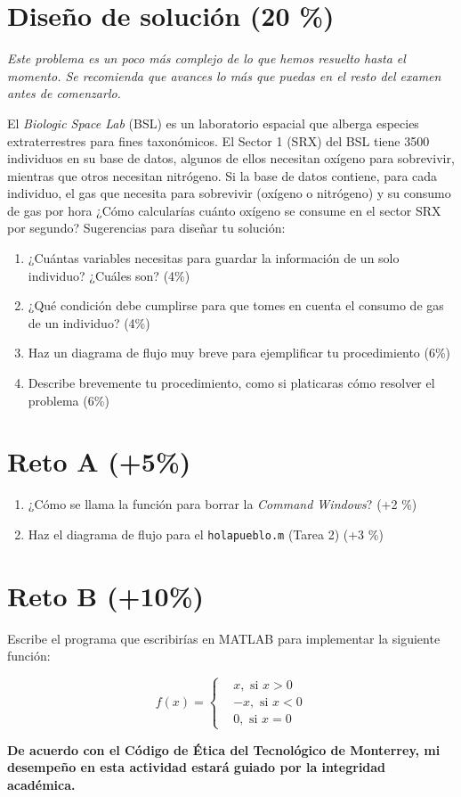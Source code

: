 \documentclass[11pt, onside]{article}
\begin{document}
\section{Diseño de solución (20 \%)}

{\small \it
Este problema es un poco más complejo de lo que hemos resuelto hasta el momento.
Se recomienda que avances lo más que puedas en el resto del examen antes de comenzarlo.
}

\bigskip

El \textit{Biologic Space Lab} (BSL) es un laboratorio espacial que alberga especies extraterrestres para fines taxonómicos.
El Sector 1 (SRX) del BSL tiene 3500 individuos en su base de datos, algunos de ellos necesitan oxígeno para sobrevivir, mientras que otros necesitan nitrógeno.
Si la base de datos contiene, para cada individuo, el gas que necesita para sobrevivir (oxígeno o nitrógeno) y su consumo de gas por hora ¿Cómo calcularías cuánto oxígeno se consume en el sector SRX por segundo?
Sugerencias para diseñar tu solución:
\begin{enumerate}[label=\alph*)]
    \item ¿Cuántas variables necesitas para guardar la información de un solo individuo? ¿Cuáles son? (4\%)
    \item ¿Qué condición debe cumplirse para que tomes en cuenta el consumo de gas de un individuo? (4\%)
    \item Haz un diagrama de flujo muy breve para ejemplificar tu procedimiento  (6\%)
    \item Describe brevemente tu procedimiento, como si platicaras cómo resolver el problema (6\%)
\end{enumerate}

\section{Reto A (+5\%)}

\begin{enumerate}[label=\alph*)]
    \item ¿Cómo se llama la función para borrar la \textit{Command Windows}? (+2 \%)
    \item Haz el diagrama de flujo para el \texttt{holapueblo.m} (Tarea 2) (+3 \%)
\end{enumerate}

\section{Reto B (+10\%)}

Escribe el programa que escribirías en MATLAB para implementar la siguiente función:

$$f(x) = %
\begin{cases}
    &x, \text{ si } x > 0 \\
    & -x, \text{ si } x < 0 \\
    &0, \text{ si } x = 0
\end{cases}
$$

\vfill

\textbf{De acuerdo con el Código de Ética del Tecnológico de Monterrey, mi desempeño en esta actividad estará guiado por la integridad académica.}
\end{document}
